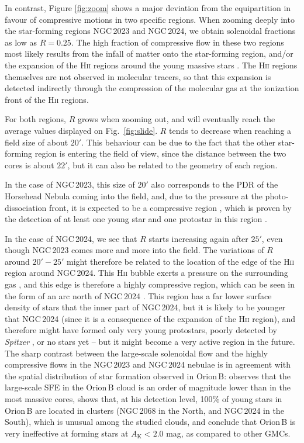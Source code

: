 \documentclass[structabstract]{aa}
\newcommand{\emm}[1]{\ensuremath{#1}}
\newcommand{\emr}[1]{\emm{\mathrm{#1}}}
\newcommand{\Ak}{\emm{A_\emr{K}}}
\newcommand{\Hii}{\textsc{Hii}}
\begin{document}
In contrast, Figure \ref{fig:zoom} shows a major deviation from the equipartition in favour of compressive motions in two specific regions. When zooming deeply into the star-forming regions NGC\,2023 and NGC\,2024, we obtain solenoidal fractions as low as $R = 0.25$. The high fraction of compressive flow in these two regions most likely results from the infall of matter onto the star-forming region, and/or the expansion of the \Hii{} regions around the young massive stars \citep{tremblin14a, geen15}. The \Hii{} regions themselves are not observed in molecular tracers, so that this expansion is detected indirectly through the compression of the molecular gas at the ionization front of the \Hii{} regions.

For both regions, $R$ grows when zooming out, and will eventually reach the average values displayed on Fig.~\ref{fig:slide}. $R$ tends to decrease when reaching a field size of about $20'$. This behaviour can be due to the fact that the other star-forming region is entering the field of view, since the distance between the two cores is about $22'$, but it can also be related to the geometry of each region. 

In the case of NGC\,2023, this size of $20'$ also corresponds to the PDR of the Horsehead Nebula coming into the field, and, due to the pressure at the photo-dissociation front, it is expected to be a compressive region \citep{wardthompson06}, which is proven by the detection of at least one young star and one protostar in this region \citep{megeath12}. 

In the case of NGC\,2024, we see that $R$ starts increasing again after $25'$, even though NGC\,2023 comes more and more into the field. The variations of $R$ around $20'-25'$ might therefore be related to the location of the edge of the \Hii{} region around NGC\,2024. This \Hii{} bubble exerts a pressure on the surrounding gas \citep{tremblin14a,tremblin14b}, and this edge is therefore a highly compressive region, which can be seen in the form of an arc north of NGC\,2024 \citep{megeath12}. This region has a far lower surface density of stars that the inner part of NGC\,2024, but it is likely to be younger that NGC\,2024 (since it is a consequence of the expansion  of the \Hii{} region), and therefore might have formed only very young protostars, poorly detected by \emph{Spitzer} \citep{megeath16}, or no stars yet -- but it might become a very active region in the future.
\\

The sharp contrast between the large-scale solenoidal flow and the highly compressive flows in the NGC\,2023 and NGC\,2024 nebulae is in agreement with the spatial distribution of star formation observed in Orion\,B: \citet{lada92} observes that the large-scale SFE in the Orion\,B cloud is an order of magnitude lower than in the most massive cores, \citet{carpenter00} shows that, at his detection level, 100\% of young stars in Orion\,B are located in clusters (NGC\,2068 in the North, and NGC\,2024 in the South), which is unusual among the studied clouds, and \citet{lada13} conclude that Orion\,B is very ineffective at forming stars at $\Ak < 2.0$ mag, as compared to other GMCs. 
\end{document}
